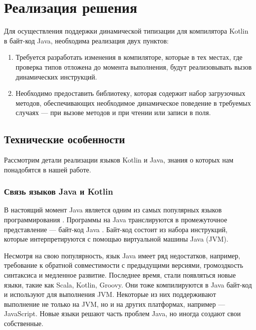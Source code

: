 \section{Реализация решения}

Для осуществления поддержки динамической типизации для компилятора Kotlin в байт-код Java, необходима реализация двух пунктов:

\begin{enumerate}
    \item Требуется разработать изменения в компиляторе, которые в тех местах, где проверка типов отложена до момента выполнения, будут реализовывать вызов динамических инструкций.
    \item Необходимо предоставить библиотеку, которая содержит набор загрузочных методов, обеспечивающих необходимое динамическое поведение в требуемых случаях --- при вызове методов и при чтении или записи в поля.
\end{enumerate}




\subsection{Технические особенности}

Рассмотрим детали реализации языков Kotlin и Java, знания о которых нам понадобятся в нашей работе.

\subsubsection{Связь языков Java и Kotlin}
\label{sec:connectKotlinWithJava}

В настоящий момент Java является одним из самых популярных языков программирования \cite{online:TIOBELanguageIndex}. Программы на Java транслируются в промежуточное представление --- байт-код Java \cite{book:yellin1996java}. Байт-код состоит из набора инструкций, которые интерпретируются с помощью виртуальной машины Java (JVM).

Несмотря на свою популярность, язык Java имеет ряд недостатков, например, требование к обратной совместимости с предыдущими версиями, громоздкость синтаксиса и медленное развитие. Последнее время, стали появляться новые языки, такие как Scala, Kotlin, Groovy. Они тоже компилируются в Java байт-код и используют для выполнения JVM. Некоторые из них поддерживают выполнение не только на JVM, но и на других платформах, например --- JavaScript.
Новые языки решают часть проблем Java, но иногда создают свои собственные.
    
